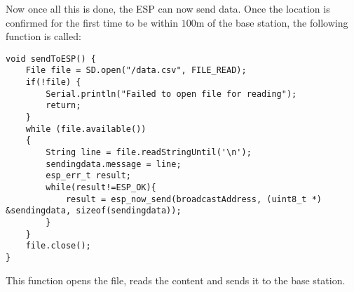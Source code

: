 \noindent
Now once all this is done, the ESP can now send data. Once the location is confirmed for the first time to be within $100 \si{\meter}$ of the base station, the following function is called:
\begin{lstlisting}
void sendToESP() {
	File file = SD.open("/data.csv", FILE_READ);
	if(!file) {
		Serial.println("Failed to open file for reading");
		return;
	}
	while (file.available())
	{
		String line = file.readStringUntil('\n');
		sendingdata.message = line;
		esp_err_t result;
		while(result!=ESP_OK){
			result = esp_now_send(broadcastAddress, (uint8_t *) &sendingdata, sizeof(sendingdata));
		}
	}
	file.close();
}
\end{lstlisting}
This function opens the file, reads the content and sends it to the base station.

